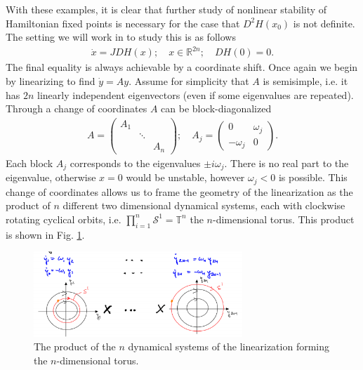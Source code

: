 With these examples, it is clear that further study of nonlinear stability of Hamiltonian fixed points is necessary for the case that $D^{2}H(x_0)$ is not definite. The setting we will work in to study this is as follows
\begin{align}
	\dot{x} = JDH(x);\quad x \in \mathbb{R}^{2n};\quad DH(0)=0.
\end{align}
The final equality is always achievable by a coordinate shift. Once again we begin by linearizing to find $\dot{y}=Ay$. Assume for simplicity that $A$ is semisimple, i.e. it has $2n$ linearly independent eigenvectors (even if some eigenvalues are repeated). Through a change of coordinates $A$ can be block-diagonalized
\begin{align}
	A = 
	\begin{pmatrix}
		A_1 & & \\
		    & \ddots & \\
		    & & A_n
	\end{pmatrix}
	;\quad A_{j} = 
	\begin{pmatrix}
		0 & \omega_j \\
		-\omega_j & 0
	\end{pmatrix}
	.
\end{align}
Each block $A_j$ corresponds to the eigenvalues $\pm i \omega _j$. There is no real part to the eigenvalue, otherwise $x=0$ would be unstable, however $\omega _j<0$ is possible. This change of coordinates allows us to frame the geometry of the linearization as the product of $n$ different two dimensional dynamical systems, each with clockwise rotating cyclical orbits, i.e. $\prod_{i=1}^{n}\mathcal{S}^{1}= \mathbb{T}^{n}$ the $n$-dimensional torus. This product is shown in Fig. \ref{fig:linearization_geometry}.
\begin{figure}[h!]
	\centering
	\includegraphics[width=0.7\textwidth]{figures/ch8/20linearization_geometry.png}
	\caption{The product of the $n$ dynamical systems of the linearization forming the $n$-dimensional torus.}
	\label{fig:linearization_geometry}
\end{figure}

